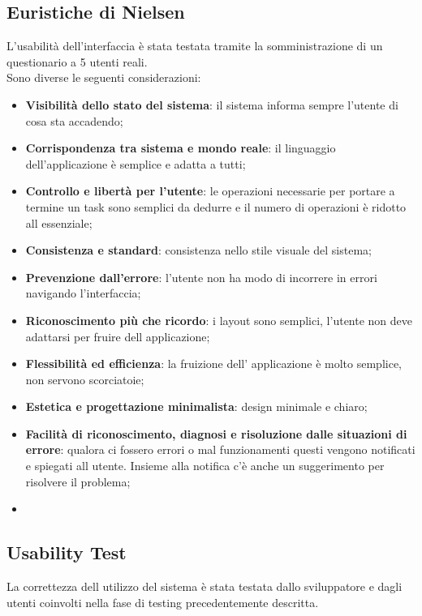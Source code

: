 \documentclass{report}
\begin{document}
\subsection{Euristiche di Nielsen}
L'usabilità dell'interfaccia è stata testata tramite la somministrazione di un questionario a 5 utenti reali.\\
Sono diverse le seguenti considerazioni:
\begin{itemize}
    \item \textbf{Visibilità dello stato del sistema}: il sistema informa sempre l'utente di cosa sta accadendo;
    \item \textbf{Corrispondenza tra sistema e mondo reale}: il linguaggio dell'applicazione è semplice e adatta a tutti;
    \item  \textbf{Controllo e libertà per l’utente}: le operazioni necessarie per portare a termine un task sono semplici da dedurre e il numero di operazioni è ridotto all essenziale;
    \item \textbf{Consistenza e standard}: consistenza nello stile visuale del sistema;
    \item \textbf{Prevenzione dall’errore}: l'utente non ha modo di incorrere in errori navigando l'interfaccia;
    \item \textbf{Riconoscimento più che ricordo}: i layout sono semplici, l'utente non deve adattarsi per fruire dell applicazione;
    \item  \textbf{Flessibilità ed efficienza}: la fruizione dell' applicazione è molto semplice, non servono scorciatoie;
    \item \textbf{Estetica e progettazione minimalista}: design minimale e chiaro;
    \item \textbf{Facilità di riconoscimento, diagnosi e risoluzione dalle situazioni di errore}: qualora ci fossero errori o mal funzionamenti questi vengono notificati e spiegati all utente. Insieme alla notifica c'è anche un suggerimento per risolvere il problema;
    \item
\end{itemize}
\subsection{Usability Test}
La correttezza dell utilizzo del sistema è stata testata dallo sviluppatore e dagli utenti coinvolti nella fase di testing precedentemente descritta.
\newpage
\end{document}
